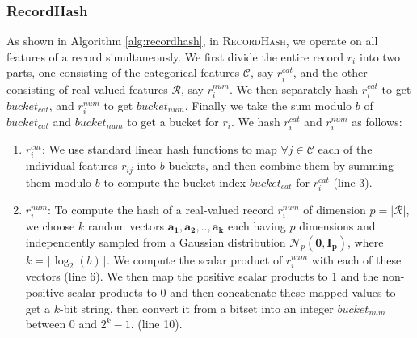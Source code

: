 \documentclass[sigconf]{acmart}
\renewcommand{\vec}[1]{\mathbf{#1}}
\begin{document}
\subsubsection{RecordHash}
\label{sec:record}

As shown in Algorithm \ref{alg:recordhash}, in \textsc{RecordHash}, we operate on all features of a record simultaneously. We first divide the entire record $r_{i}$ into two parts, one consisting of the categorical features $\mathcal{C}$, say $r_{i}^{cat}$, and the other consisting of real-valued features $\mathcal{R}$, say $r_{i}^{num}$. We then separately hash $r_{i}^{cat}$ to get $bucket_{cat}$, and $r_{i}^{num}$ to get $bucket_{num}$. Finally we take the sum modulo $b$ of $bucket_{cat}$ and $bucket_{num}$ to get a bucket for $r_{i}$. We hash $r_{i}^{cat}$ and $r_{i}^{num}$ as follows:

\begin{enumerate}
\item $r_{i}^{cat}$: We use standard linear hash functions \cite{litwin1980linear} to map $\forall j \in \mathcal{C}$ each of the individual features $r_{ij}$ into $b$ buckets, and then combine them by summing them modulo $b$ to compute the bucket index $bucket_{cat}$ for $r_{i}^{cat}$ (line 3).


\item $r_{i}^{num}$: To compute the hash of a real-valued record $r_{i}^{num}$ of dimension $p=|\mathcal{R}|$, we choose $k$ random vectors $\vec{a_{1}},\vec{a_{2}},..,\vec{a_{k}}$ each having $p$ dimensions and independently sampled from a Gaussian distribution $\mathcal{N}_{p}(\vec{0},\vec{I_p})$, where $k=\lceil \log_{2}(b) \rceil$. We compute the scalar product of $r_{i}^{num}$ with each of these vectors (line 6). We then map the positive scalar products to $1$ and the non-positive scalar products to $0$ and then concatenate these mapped values to get a $k$-bit string, then convert it from a bitset into an integer $bucket_{num}$ between $0$ and $2^k-1$. (line 10).
\end{enumerate}
\end{document}
